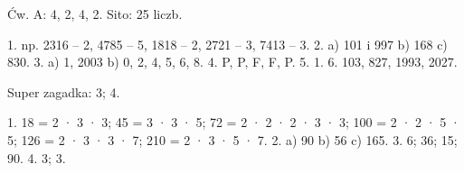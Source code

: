 Ćw. A: 4, 2, 4, 2. Sito: 25 liczb.\par
1. np. 2316 – 2, 4785 – 5, 1818 – 2, 2721 – 3, 7413 – 3.
2. a) 101 i 997 b) 168 c) 830.
3. a) 1, 2003 b) 0, 2, 4, 5, 6, 8.
4. P, P, F, F, P.
5. 1.
6. 103, 827, 1993, 2027.\par
Super zagadka: 3; 4.

1. 18 = 2 · 3 · 3; 45 = 3 · 3 · 5; 72 = 2 · 2 · 2 · 3 · 3; 100 = 2 · 2 · 5 · 5; 126 = 2 · 3 · 3 · 7; 210 = 2 · 3 · 5 · 7.
2. a) 90 b) 56 c) 165.
3. 6; 36; 15; 90.
4. 3; 3.
